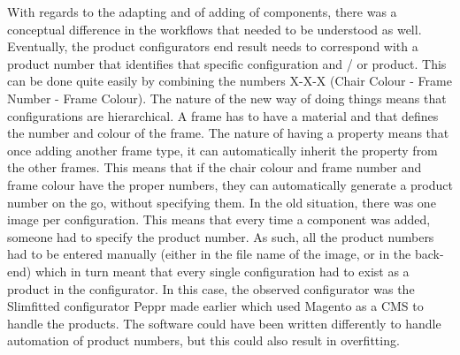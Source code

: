 With regards to the adapting and of adding of components, there was a conceptual difference in the workflows that needed to be understood as well. Eventually, the product configurators end result needs to correspond with a product number that identifies that specific configuration and / or product. This can be done quite easily by combining the numbers X-X-X (Chair Colour - Frame Number - Frame Colour). The nature of the new way of doing things means that configurations are hierarchical. A frame has to have a material and that defines the number and colour of the frame. The nature of having a property means that once adding another frame type, it can automatically inherit the property from the other frames. This means that if the chair colour and frame number and frame colour have the proper numbers, they can automatically generate a product number on the go, without specifying them.\newline
In the old situation, there was one image per configuration. This means that every time a component was added, someone had to specify the product number. As such, all the product numbers had to be entered manually (either in the file name of the image, or in the back-end) which in turn meant that every single configuration had to exist as a product in the configurator. In this case, the observed configurator was the Slimfitted configurator Peppr made earlier which used Magento as a CMS to handle the products. The software could have been written differently to handle automation of product numbers, but this could also result in overfitting.\newline
